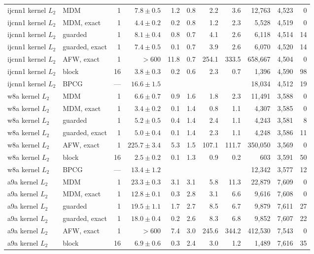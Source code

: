 \documentclass{opt2026}   %
\begin{document}
\begin{table}[h]
\begin{tabular}{llrrrrrrrrr}
\midrule
ijcnn1 kernel $L_2$ & MDM & 1 & $7.8\pm0.5$ & 1.2 & 0.8 & 2.2 & 3.6 & 12,763 & 4,523 & 0 \\
ijcnn1 kernel $L_2$ & MDM, exact & 1 & $4.4\pm0.2$ & 0.2 & 0.8 & 1.2 & 2.3 & 5,528 & 4,519 & 0 \\
ijcnn1 kernel $L_2$ & guarded & 1 & $8.1\pm0.4$ & 0.8 & 0.7 & 4.1 & 2.6 & 6,118 & 4,514 & 14 \\
ijcnn1 kernel $L_2$ & guarded, exact & 1 & $7.4\pm0.5$ & 0.1 & 0.7 & 3.9 & 2.6 & 6,070 & 4,520 & 14 \\
ijcnn1 kernel $L_2$ & AFW, exact & 1 & $>600$ & 11.8 & 0.7 & 254.1 & 333.5 & 658,667 & 4,504 & 0 \\
ijcnn1 kernel $L_2$ & block & 16 & $3.8\pm0.3$ & 0.2 & 0.6 & 2.3 & 0.7 & 1,396 & 4,590 & 98 \\
ijcnn1 kernel $L_2$ & BPCG & --- & $16.6\pm1.5$ &  & & & & 18,034 & 4,512 & 19 \\
\midrule
w8a kernel $L_2$ & MDM & 1 & $6.6\pm0.7$ & 0.9 & 1.6 & 1.8 & 2.3 & 11,491 & 3,588 & 0 \\
w8a kernel $L_2$ & MDM, exact & 1 & $3.4\pm0.2$ & 0.1 & 1.4 & 0.8 & 1.1 & 4,307 & 3,585 & 0 \\
w8a kernel $L_2$ & guarded & 1 & $5.2\pm0.5$ & 0.4 & 1.4 & 2.4 & 1.1 & 4,243 & 3,581 & 8 \\
w8a kernel $L_2$ & guarded, exact & 1 & $5.0\pm0.4$ & 0.1 & 1.4 & 2.3 & 1.1 & 4,248 & 3,586 & 11 \\
w8a kernel $L_2$ & AFW, exact & 1 & $225.7\pm3.4$ & 5.3 & 1.5 & 107.1 & 111.7 & 350,050 & 3,569 & 0 \\
w8a kernel $L_2$ & block & 16 & $2.5\pm0.2$ & 0.1 & 1.3 & 0.9 & 0.2 & 603 & 3,591 & 50 \\
w8a kernel $L_2$ & BPCG & --- & $13.4\pm1.2$ &  & & & & 12,342 & 3,577 & 12 \\
\midrule
a9a kernel $L_2$ & MDM & 1 & $23.3\pm0.3$ & 3.1 & 3.1 & 5.8 & 11.3 & 22,879 & 7,609 & 0 \\
a9a kernel $L_2$ & MDM, exact & 1 & $12.8\pm0.1$ & 0.3 & 2.8 & 3.1 & 6.6 & 9,616 & 7,608 & 0 \\
a9a kernel $L_2$ & guarded & 1 & $19.5\pm1.1$ & 1.7 & 2.7 & 8.5 & 6.7 & 9,879 & 7,611 & 27 \\
a9a kernel $L_2$ & guarded, exact & 1 & $18.0\pm0.4$ & 0.2 & 2.6 & 8.3 & 6.8 & 9,852 & 7,607 & 22 \\
a9a kernel $L_2$ & AFW, exact & 1 & $>600$ & 7.4 & 3.0 & 245.6 & 344.2 & 412,530 & 7,543 & 0 \\
a9a kernel $L_2$ & block & 16 & $6.9\pm0.6$ & 0.3 & 2.4 & 3.0 & 1.2 & 1,489 & 7,616 & 35 \\

\end{tabular}
\end{table}
\end{document}
